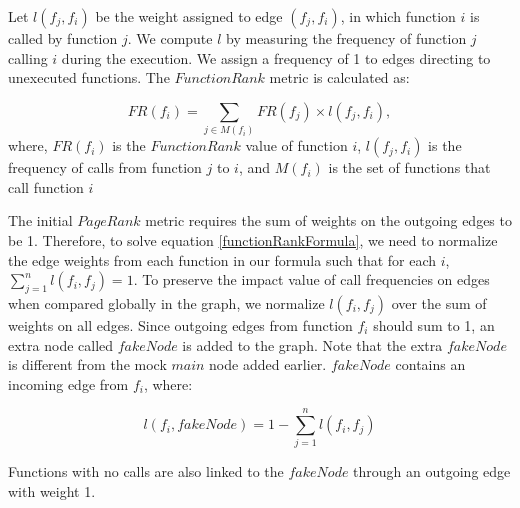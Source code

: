 Let $l(f_{j},f_{i})$ be the weight assigned to 
edge $(f_{j},f_{i})$, in which function $i$ is called by function $j$. 
We compute $l$ by measuring the frequency of function $j$ calling $i$ 
during the execution.  We assign a frequency of 1 to edges directing to unexecuted functions.
The $FunctionRank$ metric is calculated as:

\begin{equation}
FR(f_i)=\sum _{j\in M(f_i)} {FR(f_j)\times l(f_j,f_i)},
\label{functionRankFormula}
\end{equation}
where, $FR(f_i)$ is the $FunctionRank$ value of function $i$, $l(f_j,f_i)$ is
the frequency of calls from function $j$ to $i$, and $M(f_i)$ is the set of
functions that call function $i$%

The initial $PageRank$ metric requires 
the sum of weights on the outgoing edges to be 1.
Therefore, to solve equation \ref{functionRankFormula}, we need to normalize the edge weights from 
each function in our formula such that for each $i$,
$\sum _{j=1}^{n} {l(f_i,f_j)}=1$.   
To preserve the impact value of call frequencies on edges when compared globally in the graph,
we normalize $l(f_i,f_j)$ over the sum of weights on all edges. Since outgoing edges from
function $f_i$ should sum to 1, an extra node called $fakeNode$ is added to the graph. Note that the extra $fakeNode$ is different from the mock $main$ node added earlier. $fakeNode$ contains an incoming edge from $f_i$, where:

\begin{equation}
 l(f_i,fakeNode)=1-\sum _{j=1}^{n} {l(f_i,f_j)}
 \end{equation}

Functions with no calls are also linked to the $fakeNode$ through an outgoing edge with weight 1.

